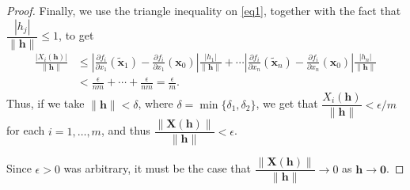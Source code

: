 \documentclass[12pt,letterpaper]{article}
\newcommand{\x}{\mathbf{x}}
\newcommand{\h}{\mathbf{h}}
\begin{document}
\begin{proof}
Finally, we use the triangle inequality on \eqref{eq1}, together with the fact that $\dfrac{|h_j|}{\lVert\h\rVert}\leq 1$, to get
\begin{align*}
\frac{\lvert X_i(\h)\rvert}{\lVert \h\rVert} &\leq \left| \frac{\partial f_i}{\partial x_1}(\tilde{\x}_1)-\frac{\partial f_i}{\partial x_1}(\x_0)\right|\frac{|h_1|}{\lVert\h\rVert}+\cdots \left|\frac{\partial f_i}{\partial x_n}(\tilde{\x}_n)-\frac{\partial f_i}{\partial x_n}(\x_0)\right|\frac{|h_n|}{\lVert\h\rVert}\\
&< \frac{\epsilon}{nm}+\cdots +\frac{\epsilon}{nm} = \frac{\epsilon}{m}.
\end{align*}
Thus, if we take $\lVert\h\rVert<\delta$, where $\delta=\min\{\delta_1,\delta_2\}$, we get that $\dfrac{X_i(\h)}{\lVert\h\rVert}<\epsilon/m$ for each $i=1,\ldots, m$, and thus $\dfrac{\lVert\mathbf{X}(\h)\rVert}{\lVert\h\rVert}<\epsilon$.

Since $\epsilon>0$ was arbitrary, it must be the case that $\dfrac{\lVert\mathbf{X}(\h)\rVert}{\lVert\h\rVert}\to 0$ as $\h\to \mathbf{0}$.
\end{proof}
\end{document}
